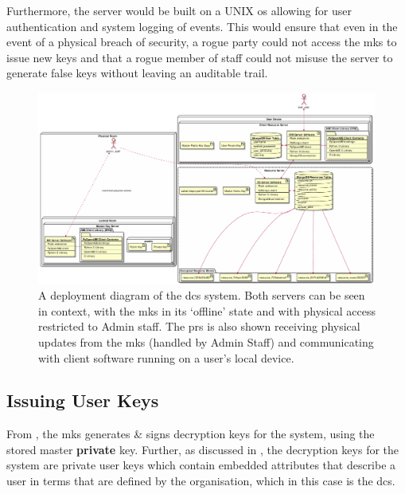 Furthermore, the server would be built on a UNIX \acrshort{os} allowing for user authentication and system logging of events. This would ensure that even in the event of a physical breach of security, a rogue party could not access the \acrshort{mks} to issue new keys and that a rogue member of staff could not misuse the server to generate false keys without leaving an auditable trail.

\begin{figure}
    \includegraphics[width=\linewidth,keepaspectratio]{images/infrastructure/deployment.pdf}

    \caption{A deployment diagram of the \acrshort{dcs} \theResServer system. Both servers can be seen in context, with the \acrfull{mks} in its `offline' state and with physical access restricted to Admin staff. The \acrfull{prs} is also shown receiving physical updates from the \acrshort{mks} (handled by Admin Staff) and communicating with client software running on a user's local device.}

    \label{fig:deployment_diagram}
\end{figure}

\subsection{Issuing User Keys}
\label{subsec:analysis_deployment_iuk}

From , the \acrfull{mks} generates \& signs decryption keys for the \theResServer system, using the stored master \textbf{private} key. Further, as discussed in , the decryption keys for the system are private user keys which contain embedded attributes that describe a user in terms that are defined by the organisation, which in this case is the \acrshort{dcs}.

